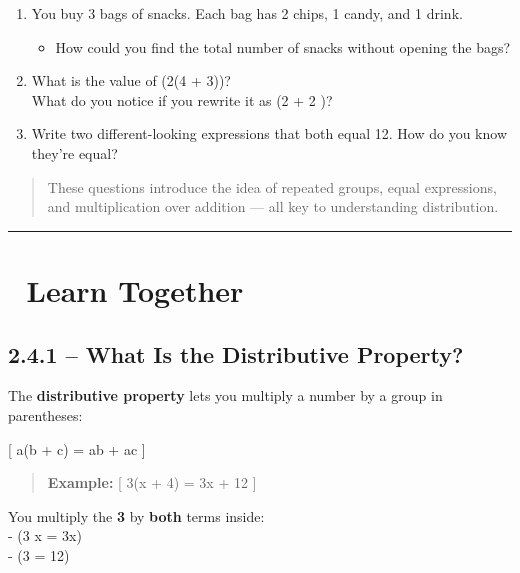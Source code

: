 \documentclass[
  letterpaper,
  DIV=11,
  numbers=noendperiod]{scrreprt}
\providecommand{\tightlist}{%
  \setlength{\itemsep}{0pt}\setlength{\parskip}{0pt}}
\begin{document}
\begin{enumerate}
\def\labelenumi{\arabic{enumi}.}
\item
  You buy 3 bags of snacks. Each bag has 2 chips, 1 candy, and 1 drink.

  \begin{itemize}
  \tightlist
  \item
    How could you find the total number of snacks without opening the
    bags?
  \end{itemize}
\item
  What is the value of (2(4 + 3))?\\
  What do you notice if you rewrite it as (2  + 2 )?
\item
  Write two different-looking expressions that both equal 12. How do you
  know they're equal?
\end{enumerate}

\begin{quote}
These questions introduce the idea of repeated groups, equal
expressions, and multiplication over addition --- all key to
understanding distribution.
\end{quote}

\begin{center}\rule{0.5\linewidth}{0.5pt}\end{center}

\section*{🧠 Learn Together}\label{learn-together-10}


\subsection*{2.4.1 -- What Is the Distributive
Property?}\label{what-is-the-distributive-property}

The \textbf{distributive property} lets you multiply a number by a group
in parentheses:

{[} a(b + c) = ab + ac {]}

\begin{quote}
\textbf{Example:} {[} 3(x + 4) = 3x + 12 {]}
\end{quote}

You multiply the \textbf{3} by \textbf{both} terms inside:\\
- (3 \cdot x = 3x)\\
- (3  = 12)
\end{document}
